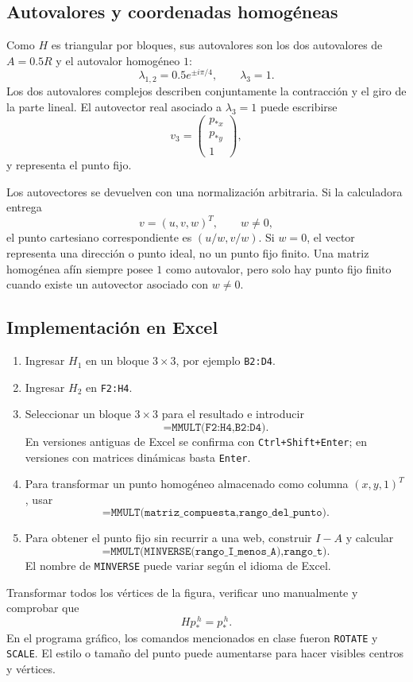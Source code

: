 \subsection{Autovalores y coordenadas homogéneas}

Como \(H\) es triangular por bloques, sus autovalores son los dos autovalores de \(A=0.5R\)
y el autovalor homogéneo \(1\):
\[
\lambda_{1,2}=0.5e^{\pm i\pi/4},
\qquad
\lambda_3=1.
\]
Los dos autovalores complejos describen conjuntamente la contracción y el giro de la parte
lineal. El autovector real asociado a \(\lambda_3=1\) puede escribirse
\[
v_3=
\begin{pmatrix}p_{\ast x}\\p_{\ast y}\\1\end{pmatrix},
\]
y representa el punto fijo.

\begin{atencion}
Los autovectores se devuelven con una normalización arbitraria. Si la calculadora entrega
\[
v=(u,v,w)^T,\qquad w\neq0,
\]
el punto cartesiano correspondiente es \((u/w,v/w)\). Si \(w=0\), el vector representa una
dirección o punto ideal, no un punto fijo finito. Una matriz homogénea afín siempre posee
\(1\) como autovalor, pero solo hay punto fijo finito cuando existe un autovector asociado
con \(w\neq0\).
\end{atencion}

\subsection{Implementación en Excel}

\begin{enumerate}
  \item Ingresar \(H_1\) en un bloque \(3\times3\), por ejemplo
  \texttt{B2:D4}.
  \item Ingresar \(H_2\) en \texttt{F2:H4}.
  \item Seleccionar un bloque \(3\times3\) para el resultado e introducir
  \[
  \texttt{=MMULT(F2:H4,B2:D4)}.
  \]
  En versiones antiguas de Excel se confirma con
  \texttt{Ctrl+Shift+Enter}; en versiones con matrices dinámicas basta \texttt{Enter}.
  \item Para transformar un punto homogéneo almacenado como columna
  \((x,y,1)^T\), usar
  \[
  \texttt{=MMULT(matriz\_compuesta,rango\_del\_punto)}.
  \]
  \item Para obtener el punto fijo sin recurrir a una web, construir \(I-A\) y calcular
  \[
  \texttt{=MMULT(MINVERSE(rango\_I\_menos\_A),rango\_t)}.
  \]
  El nombre de \texttt{MINVERSE} puede variar según el idioma de Excel.
\end{enumerate}

\begin{idea}
Transformar todos los vértices de la figura, verificar uno manualmente y comprobar que
\[
Hp_\ast^{\,h}=p_\ast^{\,h}.
\]
En el programa gráfico, los comandos mencionados en clase fueron \texttt{ROTATE} y
\texttt{SCALE}. El estilo o tamaño del punto puede aumentarse para hacer visibles centros y
vértices.
\end{idea}

